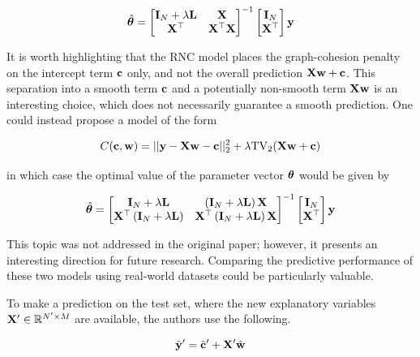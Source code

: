 \begin{equation}
    \label{eq:theta_RNC_OG}
    \hat{\boldsymbol{\theta}} = \begin{bmatrix}
        \mathbf{I}_N + \lambda \mathbf{L} & \mathbf{X} \\ \mathbf{X}^\top & \mathbf{X}^\top \mathbf{X}
    \end{bmatrix}^{-1} \begin{bmatrix}
        \mathbf{I}_N \\ \mathbf{X}^\top 
    \end{bmatrix}\mathbf{y}
\end{equation}

It is worth highlighting that the RNC model places the graph-cohesion penalty on the intercept term $\mathbf{c}$ only, and not the overall prediction $\mathbf{X}\mathbf{w} + \mathbf{c}$. This separation into a smooth term $\mathbf{c}$ and a potentially non-smooth term $\mathbf{X}\mathbf{w}$ is an interesting choice, which does not necessarily guarantee a smooth prediction. One could instead propose a model of the form 

\begin{equation}
    \label{eq:RNC_objective2}
    C(\mathbf{c}, \mathbf{w}) = ||\mathbf{y} - \mathbf{X} \mathbf{w} - \mathbf{c} ||^2_2 + \lambda \text{TV}_2(\mathbf{X} \mathbf{w} + \mathbf{c})
\end{equation}

in which case the optimal value of the parameter vector $\boldsymbol{\theta}$ would be given by 

\begin{equation}
    \label{eq:theta_RNC_OG}
    \hat{\boldsymbol{\theta}} = \begin{bmatrix}
        \mathbf{I}_N + \lambda \mathbf{L} & \left(\mathbf{I}_N + \lambda \mathbf{L}\right)\mathbf{X} \\ \mathbf{X}^\top \left(\mathbf{I}_N + \lambda \mathbf{L}\right) & \mathbf{X}^\top \left(\mathbf{I}_N + \lambda \mathbf{L}\right) \mathbf{X}
    \end{bmatrix}^{-1} \begin{bmatrix}
        \mathbf{I}_N \\ \mathbf{X}^\top 
    \end{bmatrix}\mathbf{y}
\end{equation}

This topic was not addressed in the original paper; however, it presents an interesting direction for future research. Comparing the predictive performance of these two models using real-world datasets could be particularly valuable.

To make a prediction on the test set, where the new explanatory variables $\mathbf{X}' \in \mathbb{R}^{N' \times M}$ are available, the authors use the following. 

\begin{equation}
    \hat{\mathbf{y}}' = \hat{\mathbf{c}}' + \mathbf{X}' \hat{\mathbf{w}}
\end{equation}

